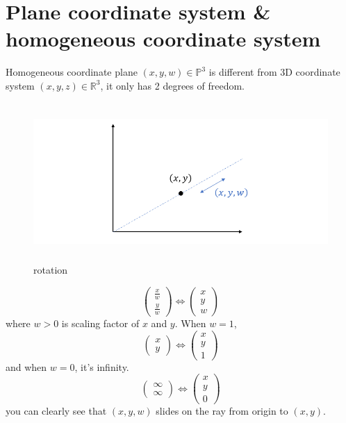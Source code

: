 \documentclass[12pt, a4 paper]{article}
\begin{document}
\section{Plane coordinate system \& homogeneous coordinate system}
Homogeneous coordinate plane $(x,y,w) \in \mathbb{P}^{3}$ is different
from 3D coordinate system $(x,y,z) \in \mathbb{R}^{3}$, it only has
2 degrees of freedom.
\begin{figure}[h]
    \centering
    \includegraphics[width=12cm,height=6cm]{coordinate system.png}
    \caption{rotation}
\end{figure}
\begin{equation}
    \begin{pmatrix}
        \frac{x}{w} \\ \frac{y}{w}
    \end{pmatrix}
    \iff\begin{pmatrix}
        x \\ y \\ w
    \end{pmatrix}
\end{equation}
\indent where $w>0$ is scaling factor of $x$ and $y$. When $w=1$,
\begin{equation}
    \begin{pmatrix}
        x \\ y
    \end{pmatrix}
    \iff \begin{pmatrix}
        x \\ y \\ 1
    \end{pmatrix}
\end{equation}
\indent and when $w=0$, it's infinity.
\begin{equation}
    \begin{pmatrix}
        \infty \\ \infty
    \end{pmatrix} \iff
    \begin{pmatrix}
        x\\y\\0
    \end{pmatrix}
\end{equation}
\indent you can clearly see that $(x,y,w)$ slides on the ray
from origin to $(x,y)$.
\end{document}
